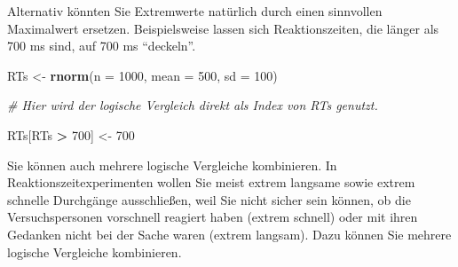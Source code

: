 \documentclass[
  ngerman,
]{book}
\newenvironment{Shaded}{\begin{snugshade}}{\end{snugshade}}
\newcommand{\AttributeTok}[1]{\textcolor[rgb]{0.13,0.29,0.53}{#1}}
\newcommand{\CommentTok}[1]{\textcolor[rgb]{0.56,0.35,0.01}{\textit{#1}}}
\newcommand{\DecValTok}[1]{\textcolor[rgb]{0.00,0.00,0.81}{#1}}
\newcommand{\FunctionTok}[1]{\textcolor[rgb]{0.13,0.29,0.53}{\textbf{#1}}}
\newcommand{\NormalTok}[1]{#1}
\newcommand{\OtherTok}[1]{\textcolor[rgb]{0.56,0.35,0.01}{#1}}
\newcommand{\SpecialCharTok}[1]{\textcolor[rgb]{0.81,0.36,0.00}{\textbf{#1}}}
\begin{document}
Alternativ könnten Sie Extremwerte natürlich durch einen sinnvollen Maximalwert ersetzen. Beispielsweise lassen sich Reaktionszeiten, die länger als 700 ms sind, auf 700 ms ``deckeln''.

\begin{Shaded}
\begin{Highlighting}[]
\NormalTok{RTs }\OtherTok{\textless{}{-}} \FunctionTok{rnorm}\NormalTok{(}\AttributeTok{n =} \DecValTok{1000}\NormalTok{, }\AttributeTok{mean =} \DecValTok{500}\NormalTok{, }\AttributeTok{sd =} \DecValTok{100}\NormalTok{)}

\CommentTok{\# Hier wird der logische Vergleich direkt als Index von RTs genutzt.}

\NormalTok{RTs[RTs }\SpecialCharTok{\textgreater{}} \DecValTok{700}\NormalTok{] }\OtherTok{\textless{}{-}} \DecValTok{700}
\end{Highlighting}
\end{Shaded}

Sie können auch mehrere logische Vergleiche kombinieren. In Reaktionszeitexperimenten wollen Sie meist extrem langsame sowie extrem schnelle Durchgänge ausschließen, weil Sie nicht sicher sein können, ob die Versuchspersonen vorschnell reagiert haben (extrem schnell) oder mit ihren Gedanken nicht bei der Sache waren (extrem langsam). Dazu können Sie mehrere logische Vergleiche kombinieren.
\end{document}
